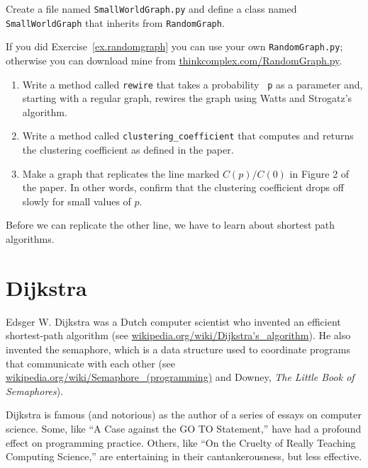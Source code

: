 \documentclass[10pt]{book}
\begin{document}
\begin{ex}

Create a file named {\tt SmallWorldGraph.py} and define a class named 
{\tt SmallWorldGraph} that inherits from {\tt RandomGraph}.

If you did Exercise~\ref{ex.randomgraph} you can use your own 
{\tt RandomGraph.py}; otherwise you can download mine from
\url{thinkcomplex.com/RandomGraph.py}.

\begin{enumerate}

\item Write a method called {\tt rewire} that takes a probability {\tt
  p} as a parameter and, starting with a regular graph, rewires
the graph using Watts and Strogatz's algorithm.

\item Write a method called \verb"clustering_coefficient" that
computes and returns the clustering coefficient as defined in the
paper.

\item Make a graph that replicates the line marked $C(p)/C(0)$ in
Figure 2 of the paper.  In other words, 
confirm that the clustering coefficient drops off slowly for
small values of $p$.

\end{enumerate}

Before we can replicate the other line, we have to learn about shortest
path algorithms.

\end{ex}


\section{Dijkstra}

Edsger W. Dijkstra was a Dutch computer scientist who invented an
efficient shortest-path algorithm (see
\url{wikipedia.org/wiki/Dijkstra's_algorithm}).  He also invented the
semaphore, which is a data structure used to coordinate programs that
communicate with each other (see
\url{wikipedia.org/wiki/Semaphore_(programming)} and Downey, {\em The
  Little Book of Semaphores}).

Dijkstra is famous (and notorious) as the author of a series
of essays on computer science.
Some, like ``A Case against the GO TO Statement,'' have
had a profound effect on programming practice.
Others, like
``On the Cruelty of Really Teaching Computing Science,'' are
entertaining in their cantankerousness, but less effective.
\end{document}
